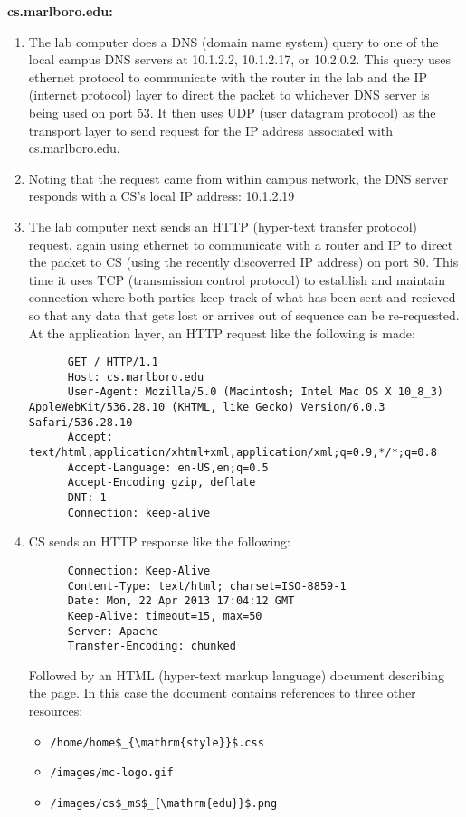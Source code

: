 \documentclass[11pt]{article}
\begin{document}
  
  \textbf{cs.marlboro.edu:}
\begin{enumerate}
\item The lab computer does a DNS (domain name system) query to one of
     the local campus DNS servers at 10.1.2.2, 10.1.2.17, or
     10.2.0.2.  This query uses ethernet protocol to communicate with
     the router in the lab and the IP (internet protocol) layer to
     direct the packet to whichever DNS server is being used on
     port 53.  It then uses UDP (user datagram protocol) as the
     transport layer to send request for the IP address associated
     with cs.marlboro.edu.
\item Noting that the request came from within campus network, the DNS
     server responds with a CS's local IP address: 10.1.2.19
\item The lab computer next sends an HTTP (hyper-text transfer
     protocol) request, again using ethernet to communicate with a
     router and IP to direct the packet to CS (using the recently
     discoverred IP address) on port 80.  This time it uses TCP
     (transmission control protocol) to establish and maintain
     connection where both parties keep track of what has been sent
     and recieved so that any data that gets lost or arrives out of
     sequence can be re-requested.  At the application layer, an HTTP
     request like the following is made:
     
\begin{verbatim}
      GET / HTTP/1.1
      Host: cs.marlboro.edu
      User-Agent: Mozilla/5.0 (Macintosh; Intel Mac OS X 10_8_3) AppleWebKit/536.28.10 (KHTML, like Gecko) Version/6.0.3 Safari/536.28.10
      Accept: text/html,application/xhtml+xml,application/xml;q=0.9,*/*;q=0.8
      Accept-Language: en-US,en;q=0.5
      Accept-Encoding gzip, deflate
      DNT: 1
      Connection: keep-alive
\end{verbatim}

\item CS sends an HTTP response like the following:
     
\begin{verbatim}
      Connection: Keep-Alive
      Content-Type: text/html; charset=ISO-8859-1
      Date: Mon, 22 Apr 2013 17:04:12 GMT
      Keep-Alive: timeout=15, max=50
      Server: Apache
      Transfer-Encoding: chunked
\end{verbatim}

     
     Followed by an HTML (hyper-text markup language) document
     describing the page.  In this case the document contains
     references to three other resources:

\begin{itemize}
\item \verb|/home/home$_{\mathrm{style}}$.css|
\item \verb|/images/mc-logo.gif|
\item \verb|/images/cs$_m$$_{\mathrm{edu}}$.png|
\end{itemize}

\end{enumerate}
\end{document}
